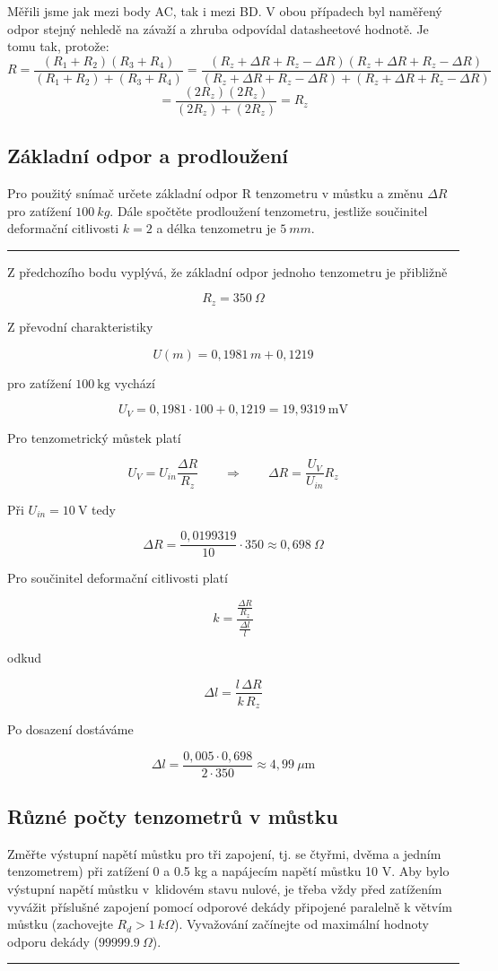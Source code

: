 \documentclass[a4paper,12pt]{article}
\begin{document}
Měřili jsme jak mezi body AC, tak i mezi BD. V obou případech byl naměřený odpor stejný nehledě na závaží a zhruba odpovídal datasheetové hodnotě. Je tomu tak, protože:
$$
R = \frac{(R_1 + R_2)(R_3 + R_4)}{(R_1 + R_2) + (R_3 + R_4)}
= \frac{(R_z + \Delta R + R_z - \Delta R)(R_z + \Delta R + R_z - \Delta R)}
{(R_z + \Delta R + R_z - \Delta R) + (R_z + \Delta R + R_z - \Delta R)}
$$
$$
= \frac{(2R_z)(2R_z)}{(2R_z) + (2R_z)}
= R_z
$$

\subsection{Základní odpor a prodloužení}
Pro použitý snímač určete základní odpor R tenzometru v můstku a změnu $\Delta R$ pro zatížení $100\ kg$. Dále spočtěte prodloužení tenzometru, jestliže součinitel deformační citlivosti $k = 2$ a délka tenzometru je $5\ mm$.
\par\noindent\rule{\textwidth}{0.4pt}

Z předchozího bodu vyplývá, že základní odpor jednoho tenzometru je přibližně

$$
R_z = 350\ \Omega
$$

Z převodní charakteristiky

$$
U(m) = 0{,}1981\,m + 0{,}1219
$$

pro zatížení \(100\ \mathrm{kg}\) vychází

$$
U_V = 0{,}1981 \cdot 100 + 0{,}1219 = 19{,}9319\ \mathrm{mV}
$$

Pro tenzometrický můstek platí

$$
U_V = U_{in}\frac{\Delta R}{R_z}
\qquad\Rightarrow\qquad
\Delta R = \frac{U_V}{U_{in}}R_z
$$

Při \(U_{in} = 10\ \mathrm{V}\) tedy

$$
\Delta R = \frac{0{,}0199319}{10}\cdot 350 \approx 0{,}698\ \Omega
$$

Pro součinitel deformační citlivosti platí

$$
k = \frac{\frac{\Delta R}{R_z}}{\frac{\Delta l}{l}}
$$

odkud

$$
\Delta l = \frac{l\,\Delta R}{k\,R_z}
$$

Po dosazení dostáváme

$$
\Delta l = \frac{0{,}005 \cdot 0{,}698}{2 \cdot 350}
\approx 4{,}99\ \mu\mathrm{m}
$$

\subsection{Různé počty tenzometrů v můstku}
Změřte výstupní napětí můstku pro tři zapojení, tj. se čtyřmi, dvěma a jedním tenzometrem) při zatížení 0
a 0.5 kg a napájecím napětí můstku 10 V. Aby bylo výstupní napětí můstku v~klidovém stavu nulové, je
třeba vždy před zatížením vyvážit příslušné zapojení pomocí odporové dekády připojené paralelně k
větvím můstku (zachovejte $R_d > 1\ k\Omega$). Vyvažování začínejte od maximální hodnoty odporu dekády
($99999.9\ \Omega$).
\par\noindent\rule{\textwidth}{0.4pt}
\end{document}
